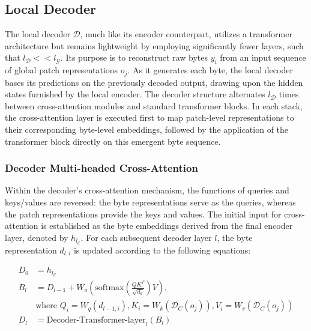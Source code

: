 \subsection{Local Decoder} 

The local decoder $\mathcal{D}$, much like its encoder counterpart, utilizes a transformer architecture but remains lightweight by employing significantly fewer layers, such that $l_{\mathcal{D}} << l_{\mathcal{G}}$. Its purpose is to reconstruct raw bytes $y_i$ from an input sequence of global patch representations $o_j$. As it generates each byte, the local decoder bases its predictions on the previously decoded output, drawing upon the hidden states furnished by the local encoder. The decoder structure alternates $l_{\mathcal{D}}$ times between cross-attention modules and standard transformer blocks. In each stack, the cross-attention layer is executed first to map patch-level representations to their corresponding byte-level embeddings, followed by the application of the transformer block directly on this emergent byte sequence.

\subsubsection{Decoder Multi-headed Cross-Attention} 

Within the decoder's cross-attention mechanism, the functions of queries and keys/values are reversed: the byte representations serve as the queries, whereas the patch representations provide the keys and values. The initial input for cross-attention is established as the byte embeddings derived from the final encoder layer, denoted by $h_{l_{\mathcal{E}}}$. For each subsequent decoder layer $l$, the byte representation $d_{l,i}$ is updated according to the following equations:

\begin{align}
D_0 &= h_{l_{\mathcal{E}}} \\
B_l &= D_{l-1} + W_o\left(\text{softmax}\left(\frac{QK^T}{\sqrt{d_k}}\right)V\right), \\
  &\text{where } Q_i = W_q(d_{l-1,i}), K_i = W_k(\mathcal{D}_C(o_j)), V_i = W_v(\mathcal{D}_C(o_j)) \\
  D_l &= \text{Decoder-Transformer-layer}_l(B_l)
\end{align}

